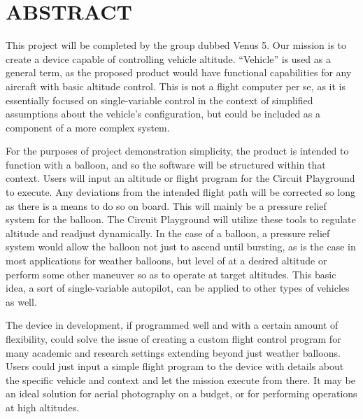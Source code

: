 \documentclass[12pt]{article}
\begin{document}
\tableofcontents
\pagebreak

\section{ABSTRACT}
This project will be completed by the group dubbed Venus 5. Our mission is to create a device capable of controlling vehicle altitude. “Vehicle” is used as a general term, as the proposed product would have functional capabilities for any aircraft with basic altitude control. This is not a flight computer per se, as it is essentially focused on single-variable control in the context of simplified assumptions about the vehicle’s configuration, but could be included as a component of a more complex system. 

For the purposes of project demonstration simplicity, the product is intended to function with a balloon, and so the software will be structured within that context. Users will input an altitude or flight program for the Circuit Playground to execute. Any deviations from the intended flight path will be corrected so long as there is a means to do so on board. This will mainly be a pressure relief system for the balloon. The Circuit Playground will utilize these tools to regulate altitude and readjust dynamically. In the case of a balloon, a pressure relief system would allow the balloon not just to ascend until bursting, as is the case in most applications for weather balloons, but level of at a desired altitude or perform some other maneuver so as to operate at target altitudes. This basic idea, a sort of single-variable autopilot, can be applied to other types of vehicles as well. 

The device in development, if programmed well and with a certain amount of flexibility, could solve the issue of creating a custom flight control program for many academic and research settings extending beyond just weather balloons. Users could just input a simple flight program to the device with details about the specific vehicle and context and let the mission execute from there. It may be an ideal solution for aerial photography on a budget, or for performing operations at high altitudes.  
\end{document}
